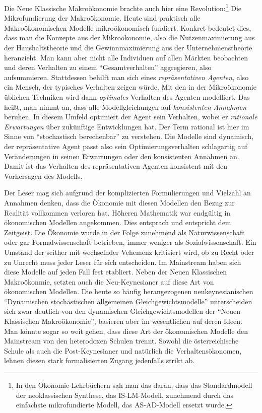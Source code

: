 \begin{enumerate}
	Die Neue Klassische Makroökonomie brachte auch hier eine Revolution:\footnote{In den Ökonomie-Lehrbüchern sah man das daran, dass das Standardmodell der neoklassischen Synthese, das IS-LM-Modell, zunehmend durch das einfachste mikrofundierte Modell, das AS-AD-Modell ersetzt wurde.} Die Mikrofundierung der Makroökonomie. Heute sind praktisch alle Makroökonomischen Modelle mikroökonomisch fundiert. Konkret bedeutet dies, dass man die Konzepte aus der Mikroökonomie, also die Nutzenmaximierung aus der Haushaltstheorie und die Gewinnmaximierung aus der Unternehmenstheorie heranzieht. Man kann aber nicht alle Individuen auf allen Märkten beobachten und deren Verhalten zu einem "`Gesamtverhalten"' aggregieren, also aufsummieren. Stattdessen behilft man sich eines \textit{repräsentativen Agenten}, also ein Mensch, der typisches Verhalten zeigen würde.	Mit den in der Mikroökonomie üblichen Techniken wird dann \textit{optimales} Verhalten des Agenten modelliert. Das heißt, man nimmt an, dass alle Modellgleichungen auf \textit{konsistenten Annahmen} beruhen. In diesem Umfeld optimiert der Agent sein Verhalten, wobei er \textit{rationale Erwartungen} über zukünftige Entwicklungen hat. Der Term rational ist hier im Sinne von "`stochastisch berechenbar"' zu verstehen. Die Modelle sind dynamisch, der repräsentative Agent passt also sein Optimierungsverhalten schlagartig auf Veränderungen in seinen Erwartungen oder den konsistenten Annahmen an. Damit ist das Verhalten des repräsentativen Agenten konsistent mit den Vorhersagen des Modells. 
	
	Der Leser mag sich aufgrund der komplizierten Formulierungen und Vielzahl an Annahmen denken, dass die Ökonomie mit diesen Modellen den Bezug zur Realität vollkommen verloren hat. Höheren Mathematik war endgültig in ökonomischen Modellen angekommen. Dies entsprach und entspricht dem Zeitgeist. Die Ökonomie wurde in der Folge zunehmend als Naturwissenschaft oder gar Formalwissenschaft betrieben, immer weniger als Sozialwissenschaft. Ein Umstand der seither mit wechselnder Vehemenz kritisiert wird, ob zu Recht oder zu Unrecht muss jeder Leser für sich entscheiden. Im Mainstream haben sich diese Modelle auf jeden Fall fest etabliert. Neben der Neuen Klassischen Makroökonmie, setzten auch die Neu-Keynesianer auf diese Art von ökonomischen Modellen. Die heute so häufig herangezogenen neukeynesianischen "`Dynamischen stochastischen allgemeinen Gleichgewichtsmodelle"' unterscheiden sich zwar deutlich von den dynamischen Gleichgewichtsmodellen der "`Neuen Klassischen Makroökonomie"', basieren aber im wesentlichen auf deren Ideen.  
	Man könnte sogar so weit gehen, dass diese Art der ökonomischen Modelle den Mainstream von den heterodoxen Schulen trennt. Sowohl die österreichische Schule als auch die Post-Keynesianer und natürlich die Verhaltensökonomen, lehnen diesen stark formalisierten Zugang jedenfalls strikt ab.


\end{enumerate}	


